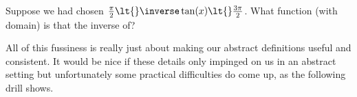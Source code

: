 \begin{ProficiencyDrill}
  Suppose we had chosen
  $\frac{\pi}{2}\lt{}\inverse\tan(x)\lt{}\frac{3\pi}{2}$. What function (with
  domain) is that the inverse of?
\end{ProficiencyDrill}




All of this fussiness is really just about making our abstract
definitions useful  and
consistent. It would be nice if these details only impinged on us in an
abstract setting but unfortunately some  practical difficulties do
come up, as the following drill shows.


